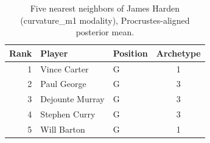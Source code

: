 \begin{table}[htbp]
  \centering\small
  \begin{tabular}{rllc}
    \toprule
    Rank & Player & Position & Archetype \\
    \midrule
    1 & Vince Carter & G & 1 \\
    2 & Paul George & G & 3 \\
    3 & Dejounte Murray & G & 3 \\
    4 & Stephen Curry & G & 3 \\
    5 & Will Barton & G & 1 \\
    \bottomrule
  \end{tabular}
  \caption{Five nearest neighbors of James Harden (curvature_m1 modality), Procrustes-aligned posterior mean.}
  \label{tab:James_Harden_neighbors_curvature_m1}
\end{table}

